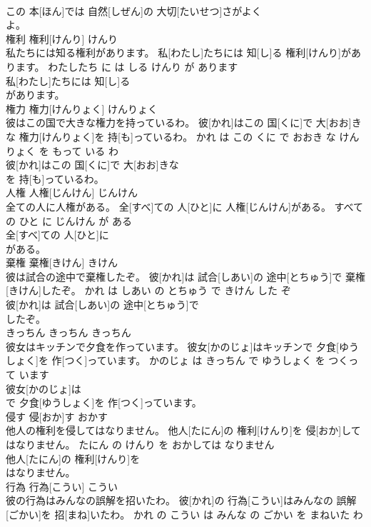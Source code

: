 \documentclass[8pt]{extreport}
\begin{document}
\begin{CJK}{UTF8}{min}
\\	この 本[ほん]では 自然[しぜん]の 大切[たいせつ]さがよく
\\	よ。			
\\	権利	権利[けんり]	けんり	
\\	私たちには知る権利があります。	私[わたし]たちには 知[し]る 権利[けんり]があります。	わたしたち に は しる けんり が あります	
\\	私[わたし]たちには 知[し]る
\\	があります。			
\\	権力	権力[けんりょく]	けんりょく	
\\	彼はこの国で大きな権力を持っているわ。	彼[かれ]はこの 国[くに]で 大[おお]きな 権力[けんりょく]を 持[も]っているわ。	かれ は この くに で おおき な けんりょく を もって いる わ	
\\	彼[かれ]はこの 国[くに]で 大[おお]きな
\\	を 持[も]っているわ。			
\\	人権	人権[じんけん]	じんけん	
\\	全ての人に人権がある。	全[すべ]ての 人[ひと]に 人権[じんけん]がある。	すべて の ひと に じんけん が ある	
\\	全[すべ]ての 人[ひと]に
\\	がある。			
\\	棄権	棄権[きけん]	きけん	
\\	彼は試合の途中で棄権したぞ。	彼[かれ]は 試合[しあい]の 途中[とちゅう]で 棄権[きけん]したぞ。	かれ は しあい の とちゅう で きけん した ぞ	
\\	彼[かれ]は 試合[しあい]の 途中[とちゅう]で
\\	したぞ。			
\\	きっちん	きっちん	きっちん	
\\	彼女はキッチンで夕食を作っています。	彼女[かのじょ]はキッチンで 夕食[ゆうしょく]を 作[つく]っています。	かのじょ は きっちん で ゆうしょく を つくって います	
\\	彼女[かのじょ]は
\\	で 夕食[ゆうしょく]を 作[つく]っています。			
\\	侵す	侵[おか]す	おかす	
\\	他人の権利を侵してはなりません。	他人[たにん]の 権利[けんり]を 侵[おか]してはなりません。	たにん の けんり を おかしては なりません	
\\	他人[たにん]の 権利[けんり]を
\\	はなりません。			
\\	行為	行為[こうい]	こうい	
\\	彼の行為はみんなの誤解を招いたわ。	彼[かれ]の 行為[こうい]はみんなの 誤解[ごかい]を 招[まね]いたわ。	かれ の こうい は みんな の ごかい を まねいた わ	

\end{CJK}
\end{document}
